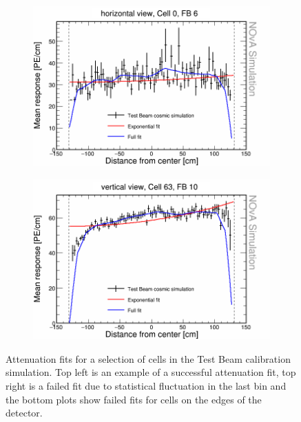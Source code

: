 \begin{figure}[h]
\begin{subfigure}{0.495\textwidth}
  \end{subfigure}
  \begin{subfigure}{0.495\textwidth}
    \includegraphics[width=\linewidth]{Plots/RelativeCalibrationResults/sim_fb6_001_000.png}
  \end{subfigure}
  \begin{subfigure}{0.495\textwidth}
    \includegraphics[width=\linewidth]{Plots/RelativeCalibrationResults/sim_fb10_000_063.png}
  \end{subfigure}
  \caption[Example attenuation fits for simulation]{Attenuation fits for a selection of cells in the Test Beam calibration simulation. Top left is an example of a successful attenuation fit, top right is a failed fit due to statistical fluctuation in the last bin and the bottom plots show failed fits for cells on the edges of the detector.}
  \label{fig:AttenfitResultsSimulation}
\end{figure}

